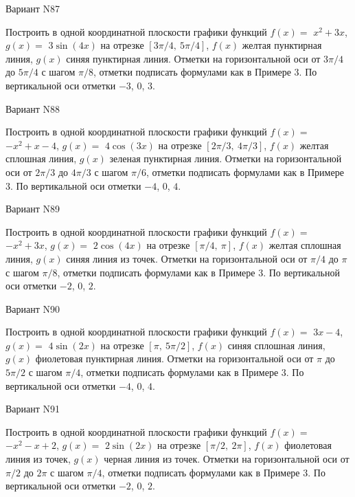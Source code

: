 \documentclass[11pt]{report}
\begin{document}
Вариант N87

Построить в одной координатной плоскости графики функций $f(x) = $
    $x^{2} + 3 x$, $g(x) = $
    $3 \sin{\left(4 x \right)}$ на 
    отрезке $\left[ 3 \pi / 4, \  5 \pi / 4\right]$, $f(x)$ желтая 
    пунктирная линия, $g(x)$ синяя пунктирная линия. 
    Отметки на горизонтальной оси от $3 \pi / 4$ до $5 \pi / 4$ с 
    шагом $\pi / 8$, отметки подписать формулами как в Примере 3.  
    По вертикальной оси отметки $-3$, 0, $3$.

Вариант N88

Построить в одной координатной плоскости графики функций $f(x) = $
    $- x^{2} + x - 4$, $g(x) = $
    $4 \cos{\left(3 x \right)}$ на 
    отрезке $\left[ 2 \pi / 3, \  4 \pi / 3\right]$, $f(x)$ желтая 
    сплошная линия, $g(x)$ зеленая пунктирная линия. 
    Отметки на горизонтальной оси от $2 \pi / 3$ до $4 \pi / 3$ с 
    шагом $\pi / 6$, отметки подписать формулами как в Примере 3.  
    По вертикальной оси отметки $-4$, 0, $4$.

Вариант N89

Построить в одной координатной плоскости графики функций $f(x) = $
    $- x^{2} + 3 x$, $g(x) = $
    $2 \cos{\left(4 x \right)}$ на 
    отрезке $\left[ \pi / 4, \  \pi\right]$, $f(x)$ желтая 
    сплошная линия, $g(x)$ синяя линия из точек. 
    Отметки на горизонтальной оси от $\pi / 4$ до $\pi$ с 
    шагом $\pi / 8$, отметки подписать формулами как в Примере 3.  
    По вертикальной оси отметки $-2$, 0, $2$.

Вариант N90

Построить в одной координатной плоскости графики функций $f(x) = $
    $3 x - 4$, $g(x) = $
    $4 \sin{\left(2 x \right)}$ на 
    отрезке $\left[ \pi, \  5 \pi / 2\right]$, $f(x)$ синяя 
    сплошная линия, $g(x)$ фиолетовая пунктирная линия. 
    Отметки на горизонтальной оси от $\pi$ до $5 \pi / 2$ с 
    шагом $\pi / 4$, отметки подписать формулами как в Примере 3.  
    По вертикальной оси отметки $-4$, 0, $4$.

Вариант N91

Построить в одной координатной плоскости графики функций $f(x) = $
    $- x^{2} - x + 2$, $g(x) = $
    $2 \sin{\left(2 x \right)}$ на 
    отрезке $\left[ \pi / 2, \  2 \pi\right]$, $f(x)$ фиолетовая 
    линия из точек, $g(x)$ черная линия из точек. 
    Отметки на горизонтальной оси от $\pi / 2$ до $2 \pi$ с 
    шагом $\pi / 4$, отметки подписать формулами как в Примере 3.  
    По вертикальной оси отметки $-2$, 0, $2$.
\end{document}
